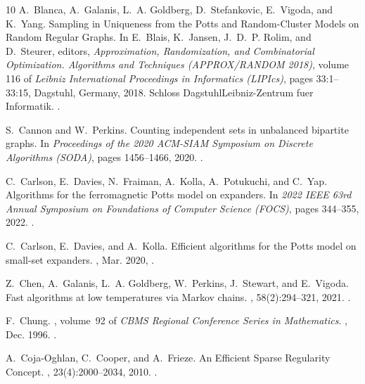 \documentclass[11pt,letterpaper]{amsart}
\theoremstyle{definition}
\begin{document}
\begin{thebibliography}{10}
A.~Blanca, A.~Galanis, L.~A. Goldberg, D.~Stefankovic, E.~Vigoda, and K.~Yang.
\newblock Sampling in {{Uniqueness}} from the {{Potts}} and {{Random-Cluster
  Models}} on {{Random Regular Graphs}}.
\newblock In E.~Blais, K.~Jansen, J.~D.~P. Rolim, and D.~Steurer, editors, {\em
  Approximation, {{Randomization}}, and {{Combinatorial Optimization}}.
  {{Algorithms}} and {{Techniques}} ({{APPROX}}/{{RANDOM}} 2018)}, volume 116
  of {\em Leibniz {{International Proceedings}} in {{Informatics}}
  ({{LIPIcs}})}, pages 33:1--33:15, {Dagstuhl, Germany}, 2018. {Schloss
  Dagstuhl\textendash Leibniz-Zentrum fuer Informatik}.
\newblock {}.

S.~Cannon and W.~Perkins.
\newblock Counting independent sets in unbalanced bipartite graphs.
\newblock In {\em Proceedings of the 2020 ACM-SIAM Symposium on Discrete
  Algorithms (SODA)}, pages 1456--1466, 2020.
\newblock {}.

C.~Carlson, E.~Davies, N.~Fraiman, A.~Kolla, A.~Potukuchi, and C.~Yap.
\newblock Algorithms for the ferromagnetic {{Potts}} model on expanders.
\newblock In {\em 2022 {{IEEE}} 63rd {{Annual Symposium}} on {{Foundations}} of
  {{Computer Science}} ({{FOCS}})}, pages 344--355, 2022.
\newblock {}.

C.~Carlson, E.~Davies, and A.~Kolla.
\newblock Efficient algorithms for the {{Potts}} model on small-set expanders.
,
  Mar. 2020, .

Z.~Chen, A.~Galanis, L.~A. Goldberg, W.~Perkins, J.~Stewart, and E.~Vigoda.
\newblock Fast algorithms at low temperatures via {{Markov}} chains.
, 58(2):294--321, 2021.
\newblock {}.

F.~Chung.
, volume~92 of {\em {{CBMS Regional
  Conference Series}} in {{Mathematics}}}.
, Dec. 1996.
\newblock {}.

A.~{Coja-Oghlan}, C.~Cooper, and A.~Frieze.
\newblock An {{Efficient Sparse Regularity Concept}}.
, 23(4):2000--2034, 2010.
\newblock {}.


\end{thebibliography}
\end{document}
